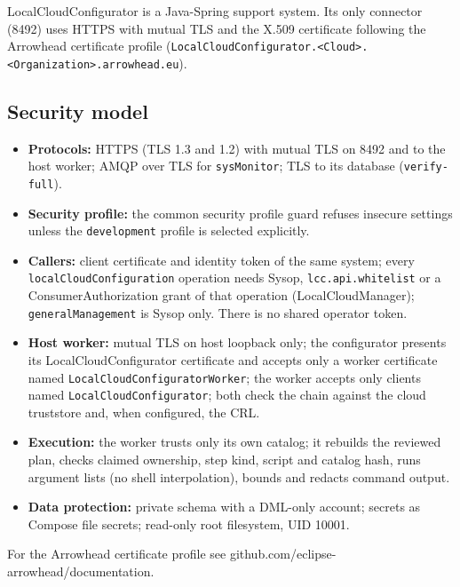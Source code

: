 \documentclass[a4paper]{arrowhead}
\begin{document}
LocalCloudConfigurator is a Java-Spring support system. Its only connector (8492) uses HTTPS with mutual TLS and the X.509 certificate following the Arrowhead certificate profile (\texttt{LocalCloudConfigurator.<Cloud>.<Organization>.arrowhead.eu}).

\subsection{Security model}

\begin{itemize}
  \item \textbf{Protocols:} HTTPS (TLS 1.3 and 1.2) with mutual TLS on 8492 and to the host worker; AMQP over TLS for \texttt{sysMonitor}; TLS to its database (\texttt{verify-\allowbreak{}full}).
  \item \textbf{Security profile:} the common security profile guard refuses insecure settings unless the \texttt{development} profile is selected explicitly.
  \item \textbf{Callers:} client certificate and identity token of the same system; every \texttt{local\allowbreak{}Cloud\allowbreak{}Configuration} operation needs Sysop, \texttt{lcc.\allowbreak{}api.\allowbreak{}whitelist} or a ConsumerAuthorization grant of that operation (LocalCloudManager); \texttt{general\allowbreak{}Management} is Sysop only. There is no shared operator token.
  \item \textbf{Host worker:} mutual TLS on host loopback only; the configurator presents its LocalCloudConfigurator certificate and accepts only a worker certificate named \texttt{LocalCloudConfiguratorWorker}; the worker accepts only clients named \texttt{LocalCloudConfigurator}; both check the chain against the cloud truststore and, when configured, the CRL.
  \item \textbf{Execution:} the worker trusts only its own catalog; it rebuilds the reviewed plan, checks claimed ownership, step kind, script and catalog hash, runs argument lists (no shell interpolation), bounds and redacts command output.
  \item \textbf{Data protection:} private schema with a DML-only account; secrets as Compose file secrets; read-only root filesystem, UID 10001.
\end{itemize}

For the Arrowhead certificate profile see github.com/eclipse-arrowhead/documentation.




\end{document}
